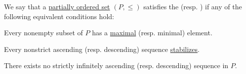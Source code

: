 \begin{definition}\label{def:chain_condition}
  We say that a \hyperref[def:partially_ordered_set]{partially ordered set} \( (P, \leq) \) satisfies the  (resp. ) if any of the following equivalent conditions hold:
  \begin{thmenum}
     Every nonempty subset of \( P \) has a \hyperref[def:extremal_points/maximal_and_minimal_element]{maximal} (resp. minimal) element.

    \medskip

     Every nonstrict ascending (resp. descending) sequence \hyperref[def:stabilizing_chain]{stabilizes}.

    \medskip

     There exists no strictly infinitely ascending (resp. descending) sequence in \( P \).

    \medskip
  \end{thmenum}
\end{definition}

